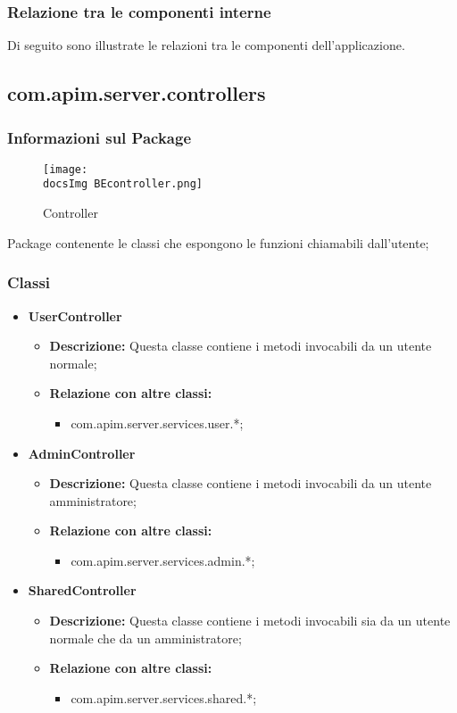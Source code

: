 {{        \subsubsection{Relazione tra le componenti interne}
        Di seguito sono illustrate le relazioni tra le componenti dell'applicazione.
  }
  \subsection{com.apim.server.controllers}{
    \subsubsection{Informazioni sul Package}
        \begin{figure}[ht]
          \centering
          \texttt{[image: \\docsImg BEcontroller.png]}
          \caption{Controller}
          \label{Controller}
        \end{figure}
        Package contenente le classi che espongono le funzioni  chiamabili dall'utente;
        \subsubsection{Classi}
        \begin{itemize} \itemsep1pt
        \item \textbf{UserController}
        \begin{itemize}
        \item \textbf{Descrizione:} Questa classe contiene i metodi invocabili da un utente normale;
        \item \textbf{Relazione con altre classi:}
        \begin{itemize}
        \item com.apim.server.services.user.*;
        \end{itemize}
        \end{itemize}
        \item \textbf{AdminController}
        \begin{itemize}
        \item \textbf{Descrizione:} Questa classe contiene i metodi invocabili da un utente amministratore;
        \item \textbf{Relazione con altre classi:}
        \begin{itemize}
        \item com.apim.server.services.admin.*;
        \end{itemize}
        \end{itemize}
        \item \textbf{SharedController}
        \begin{itemize}
        \item \textbf{Descrizione:} Questa classe contiene i metodi invocabili sia da un utente normale che da un amministratore;
        \item \textbf{Relazione con altre classi:}
        \begin{itemize}
        \item com.apim.server.services.shared.*;
        \end{itemize}
        \end{itemize}
        \end{itemize}
  }
}
